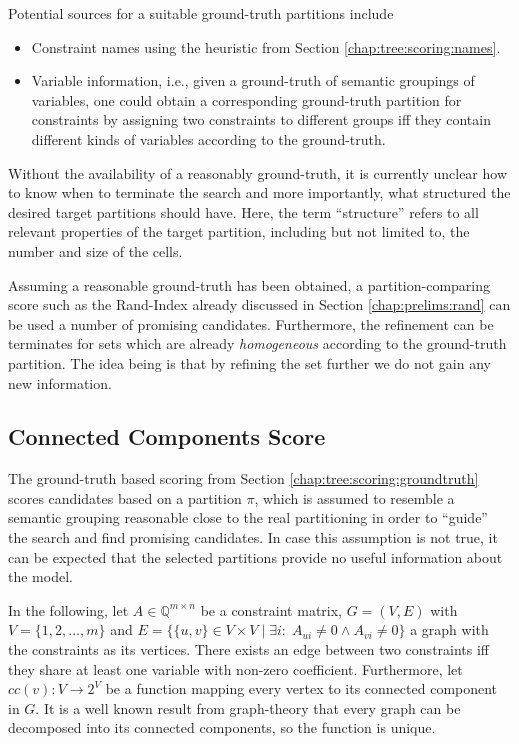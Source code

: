 			Potential sources for a suitable ground-truth partitions include
			\begin{itemize}
				\item Constraint names using the heuristic from Section \ref{chap:tree:scoring:names}.
				\item Variable information, i.e., given a ground-truth of semantic groupings of variables, one could obtain a corresponding ground-truth partition for constraints by assigning two constraints to different groups iff they contain different kinds of variables according to the ground-truth.
			\end{itemize}

			Without the availability of a reasonably ground-truth, it is currently unclear how to know when to terminate the search and more importantly, what structured the desired target partitions should have.
			Here, the term \enquote{structure} refers to all relevant properties of the target partition, including but not limited to, the number and size of the cells.

			Assuming a reasonable ground-truth has been obtained, a partition-comparing score such as the Rand-Index already discussed in Section \ref{chap:prelims:rand} can be used a number of promising candidates.
			Furthermore, the refinement can be terminates for sets which are already \textit{homogeneous} according to the ground-truth partition.
			The idea being is that by refining the set further we do not gain any new information.

			\clearpage

		\subsection{Connected Components Score}

			The ground-truth based scoring from Section \ref{chap:tree:scoring:groundtruth} scores candidates based on a partition $\pi$, which is assumed to resemble a semantic grouping reasonable close to the real partitioning in order to \enquote{guide} the search and find promising candidates.
			In case this assumption is not true, it can be expected that the selected partitions provide no useful information about the model.

			In the following, let $A \in \mathbb{Q}^{m \times n}$ be a constraint matrix, $G = (V, E)$ with $V = \{ 1, 2, \ldots, m \}$ and $E = \{ \{ u, v \} \in V \times V \mid \exists i: \; A_{ui} \neq 0 \land A_{vi} \neq 0 \}$ a graph with the constraints as its vertices.
			There exists an edge between two constraints iff they share at least one variable with non-zero coefficient.
			Furthermore, let $cc(v): V \xrightarrow{} 2^V$ be a function mapping every vertex to its connected component in $G$.
			It is a well known result from graph-theory that every graph can be decomposed into its connected components, so the function is unique.

